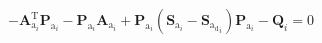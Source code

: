 \documentclass[3p]{elsarticle}
\begin{document}
\begin{equation}
    -\mathbf{A}_{\mathrm{a}_i}^\mathrm{T}\mathbf{P}_{\mathrm{a}_{i}} - \mathbf{P}_{\mathrm{a}_{i}}\mathbf{A}_{\mathrm{a}_i}  + \mathbf{P}_{\mathrm{a}_{i}}(\mathbf{S}_{\mathrm{a}_i} - \mathbf{S}_{\mathrm{a_d}_i}) \mathbf{P}_{\mathrm{a}_{i}} - \mathbf{Q}_{i} = 0 
\end{equation}








\end{document}
